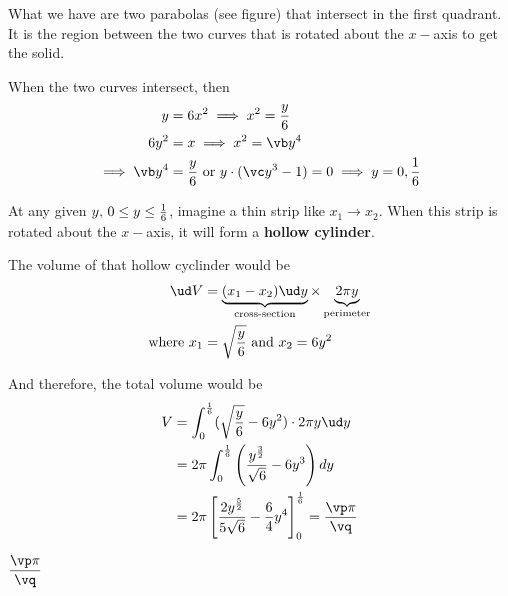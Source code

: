 \begin{solution}[\fullpage]
  What we have are two parabolas (see figure) that intersect in the first quadrant. 
  It is the region between the two curves that is rotated about the $x-$axis to get the solid.
  
  When the two curves intersect, then 
  \begin{align}
    y &= \va x^2 \implies x^2 = \dfrac{y}\va \\
    \va y^2 &= x \implies x^2 = \vb y^4 \\
    \implies \vb y^4 &= \dfrac{y}\va \text{ or } y\cdot (\vc y^3-1) = 0 \implies y = 0, \dfrac{1}\va
  \end{align}

  At any given $y,\, 0\leq y\leq\frac{1}{6}$, imagine a thin strip like $x_1\to x_2$. When
  this strip is rotated about the $x-$axis, it will form a \textbf{hollow cylinder}. 

  The volume of that hollow cyclinder would be 
	\begin{align}
		\ud V &= \underbrace{(x_1-x_2)\ud y}_{\text{cross-section}}\times
		         \underbrace{2\pi y}_{\text{perimeter}} \\
		\text{where } x_1 &= \sqrt{\frac{y}\va} \text{ and } x_2 = \va y^2
	\end{align}

	And therefore, the total volume would be
	\begin{align}
		V &= \int_0^{\frac{1}\va} (\sqrt{\frac{y}\va} - \va y^2)\cdot 2\pi y\ud y \\
		  &= 2\pi\int_0^{\frac{1}\va}\left(\dfrac{y^{\frac{3}{2}}}{\sqrt\va} - \va y^3 \right) dy \\ 
		  &= 2\pi\left[ \dfrac{2y^{\frac{5}{2}}}{5\sqrt\va} - \dfrac\va{4} y^4\right]_0^{\frac{1}\va} = \dfrac{\vp\pi}\vq
	\end{align}
\end{solution}

\ifprintanswers\begin{codex}$\dfrac{\vp\pi}\vq$\end{codex}\fi
